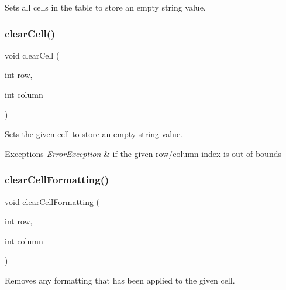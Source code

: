 Sets all cells in the table to store an empty string value. 

\mbox{\label{classGTable_ab7bffbf52806e438ac155886079d9bf6}} 
\subsubsection{\texorpdfstring{clear\+Cell()}{clearCell()}}
{\footnotesize\ttfamily void clear\+Cell (\begin{DoxyParamCaption}\item[{int}]{row,  }\item[{int}]{column }\end{DoxyParamCaption})\hspace{0.3cm}{\ttfamily [virtual]}}



Sets the given cell to store an empty string value. 


\begin{DoxyExceptions}{Exceptions}
{\em Error\+Exception} & if the given row/column index is out of bounds \\
\hline
\end{DoxyExceptions}
\mbox{\label{classGTable_a5ba4fe558e9d315c123ecd9e896065ca}} 
\subsubsection{\texorpdfstring{clear\+Cell\+Formatting()}{clearCellFormatting()}}
{\footnotesize\ttfamily void clear\+Cell\+Formatting (\begin{DoxyParamCaption}\item[{int}]{row,  }\item[{int}]{column }\end{DoxyParamCaption})\hspace{0.3cm}{\ttfamily [virtual]}}



Removes any formatting that has been applied to the given cell. 

\mbox{\label{classGObservable_a80cfa040459ff53594adbd6a51ec8f43}} 
